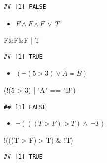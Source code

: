 \documentclass[12pt,a4paper]{article}
\newenvironment{Shaded}{\begin{snugshade}}{\end{snugshade}}
\newcommand{\DecValTok}[1]{\textcolor[rgb]{0.00,0.00,0.81}{#1}}
\newcommand{\NormalTok}[1]{#1}
\newcommand{\SpecialCharTok}[1]{\textcolor[rgb]{0.00,0.00,0.00}{#1}}
\newcommand{\StringTok}[1]{\textcolor[rgb]{0.31,0.60,0.02}{#1}}
\begin{document}
\begin{verbatim}
## [1] FALSE
\end{verbatim}

\begin{itemize}
  \item $F \land F \land F\ \lor \ T$
\end{itemize}

\begin{Shaded}
\begin{Highlighting}[]
\NormalTok{    F}\SpecialCharTok{\&}\NormalTok{F}\SpecialCharTok{\&}\NormalTok{F }\SpecialCharTok{|}\NormalTok{ T}
\end{Highlighting}
\end{Shaded}

\begin{verbatim}
## [1] TRUE
\end{verbatim}

\begin{itemize}
  \item $(\neg (5 > 3) \lor A = B)$
\end{itemize}

\begin{Shaded}
\begin{Highlighting}[]
\NormalTok{    (}\SpecialCharTok{!}\NormalTok{(}\DecValTok{5} \SpecialCharTok{\textgreater{}} \DecValTok{3}\NormalTok{) }\SpecialCharTok{|} \StringTok{"A"} \SpecialCharTok{==} \StringTok{"B"}\NormalTok{) }
\end{Highlighting}
\end{Shaded}

\begin{verbatim}
## [1] FALSE
\end{verbatim}

\begin{itemize}
  \item $\neg(((T > F) > T) \land \ \neg T)$
\end{itemize}

\begin{Shaded}
\begin{Highlighting}[]
    \SpecialCharTok{!}\NormalTok{(((T }\SpecialCharTok{\textgreater{}}\NormalTok{ F) }\SpecialCharTok{\textgreater{}}\NormalTok{ T) }\SpecialCharTok{\&} \SpecialCharTok{!}\NormalTok{T)}
\end{Highlighting}
\end{Shaded}

\begin{verbatim}
## [1] TRUE
\end{verbatim}
\end{document}
